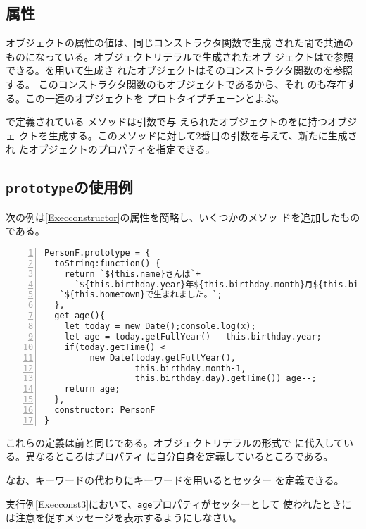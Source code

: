 \begin{Exec}
 \subsection{\protect{}属性}
 オブジェクトの属性の値は、同じコンストラクタ関数で生成
 された間で共通のものになっている。オブジェクトリテラルで生成されたオブ
 ジェクトはで参照できる。を用いて生成さ
 れたオブジェクトはそのコンストラクタ関数のを参照する。
 このコンストラクタ関数のもオブジェクトであるから、それ
 のも存在する。この一連のオブジェクトを
 プロトタイプチェーンとよぶ。

 \JS で定義されている  メソッドは引数で与
 えられたオブジェクトのをに持つオブジェ
 クトを生成する。このメソッドに対して2番目の引数を与えて、新たに生成され
 たオブジェクトのプロパティを指定できる。
 \subsection{\protect\texttt{prototype}の使用例}
 \begin{Exec}\upshape\label{ExecConst2}
  次の例は\ref{Execconstructor}の属性を簡略し、いくつかのメソッ
 ドを追加したものである。
\begin{Verbatim}[numbers=left]
PersonF.prototype = {
  toString:function() {
    return `${this.name}さんは`+
      `${this.birthday.year}年${this.birthday.month}月${this.birthday.day}日に` +
   `${this.hometown}で生まれました。`;
  },
  get age(){
    let today = new Date();console.log(x);
    let age = today.getFullYear() - this.birthday.year;
    if(today.getTime() <
         new Date(today.getFullYear(),
                  this.birthday.month-1,
                  this.birthday.day).getTime()) age--;
    return age;
  },
  constructor: PersonF
}
\end{Verbatim}
 \end{Exec}
これらの定義は前と同じである。オブジェクトリテラルの形式で
に代入している。異なるところはプロパティ
に自分自身を定義しているところである。

なお、キーワードの代わりにキーワードを用いるとセッター
を定義できる。

\begin{Prob}\upshape
 実行例\ref{Execconst3}において、\texttt{age}プロパティがセッターとして
 使われたときには注意を促すメッセージを表示するようにしなさい。
\end{Prob}

\end{Exec}
